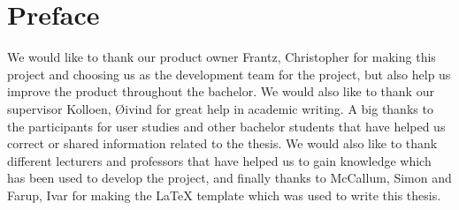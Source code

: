 \chapter*{Preface} %
\label{chap:preface}

We would like to thank our product owner Frantz, Christopher for making this project and choosing us as the development team for the project, but also help us improve the product throughout the bachelor. We would also like to thank our supervisor Kolloen, Øivind for great help in academic writing. A big thanks to the participants for user studies and other bachelor students that have helped us correct or shared information related to the thesis. We would also like to thank different lecturers and professors that have helped us to gain knowledge which has been used to develop the project, and finally thanks to McCallum, Simon and Farup, Ivar for making the \LaTeX{} template which was used to write this thesis.